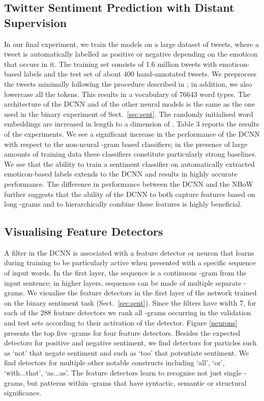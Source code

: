 \documentclass[11pt]{article}
\begin{document}
\subsection{Twitter Sentiment Prediction with Distant Supervision}

In our final experiment, we train the models on a large dataset of tweets, where a tweet is automatically labelled as positive or negative depending on the emoticon that occurs in it. The training set consists of 1.6 million tweets with emoticon-based labels and the test set of about 400 hand-annotated tweets. We preprocess the tweets minimally following the procedure described in ; in addition, we also lowercase all the  tokens. This results in a vocabulary of 76643 word types. The architecture of the DCNN and of the other neural models is the same as the one used in the binary experiment of Sect.~\ref{sec:sent}. The randomly initialised word embeddings are increased in length to a dimension of . Table 3 reports the results of the experiments. We see a significant increase in the performance of the DCNN with respect to the non-neural -gram based classifiers; in the presence of large amounts of training data these classifiers constitute particularly strong baselines. We see that the ability to train a sentiment classifier on automatically extracted emoticon-based labels extends to the DCNN and results in highly accurate performance. The difference in performance between the DCNN and the NBoW further suggests that the ability of the DCNN to both capture features based on long -grams and to hierarchically combine these features is highly beneficial.



\subsection{Visualising Feature Detectors}

A filter in the DCNN is associated with a feature detector or neuron that learns during training to be particularly active when presented with a specific sequence of input words. In the first layer, the sequence is a continuous -gram from the input sentence; in higher layers, sequences can be made of multiple separate -grams. We visualise the feature detectors in the first layer of the network trained on the binary sentiment task (Sect.~\ref{sec:sent}). Since the filters have width 7, for each of the 288 feature detectors we rank all -grams occurring in the validation and test sets according to their activation of the detector. Figure \ref{neurons} presents the top five -grams for four feature detectors. Besides the expected detectors for positive and negative sentiment, we find detectors for particles such as `not' that negate sentiment and such as `too' that potentiate sentiment. We find detectors for multiple other notable constructs including `all', `or', `with...that', `as...as'. The feature detectors learn to recognise not just single -grams, but patterns within -grams that  have syntactic, semantic or structural significance.
\end{document}

